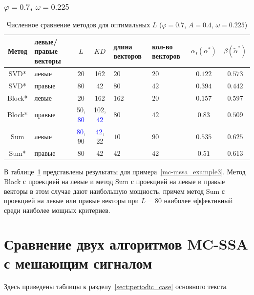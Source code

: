 \documentclass[specialist,
substylefile = spbu.rtx,
               subf,href,colorlinks=true, 12pt]{disser}
\theoremstyle{definition}
\begin{document}
\subsubsection{$\varphi=0.7$, $\omega=0.225$}
\begin{table}[h]
	\caption{Численное сравнение методов для оптимальных $L$ ($\varphi=0.7$, $A=0.4$, $\omega=0.225$)}
	\label{tab:res_mc-mssa_omega0225}
	\centering
	\begin{tabular}{|c>{\centering\arraybackslash}m{1in}cc>{\centering\arraybackslash}m{1in} >{\centering\arraybackslash}m{0.8in}cc|}\hline
		Метод & левые/правые векторы & $L$ & $KD$ & длина векторов & кол-во векторов & $\alpha_I(\alpha^*)$ & $\beta(\widetilde{\alpha}^*)$ \\
		\hline
		SVD* & левые & $20$ & 162 & $20$ & $20$ & $0.122$ & $0.573$ \\
		\hline
		SVD* & правые & $80$ & 42 & $80$ & $42$ & $0.394$ & $0.442$ \\
		\hline
		Block* & левые & $20$ & 162 & $162$ & $20$ & $0.157$ & $\mathbf{0.597}$ \\
		\hline
		Block* & правые & 50, \textcolor{blue}{80} & 102, \textcolor{blue}{42} & $80$ & $42$ & $0.83$ & $0.509$\\
		\hline
		Sum & левые & \textcolor{blue}{80}, 90 & \textcolor{blue}{42}, 22 & $10$ & $90$ & $0.535$ & $\mathbf{0.625}$ \\
		\hline
		Sum* & правые & $80$ & 42 & $42$ & $42$ & $0.51$ & $\mathbf{0.613}$ \\
		\hline
	\end{tabular}
\end{table}
В таблице~\ref{tab:res_mc-mssa_omega0225} представлены результаты для примера~\ref{mc-mssa_example3}. Метод Block с проекцией на левые и метод Sum с проекцией на левые и правые векторы в этом случае дают наибольшую мощность, причем метод Sum с проекцией на левые или правые векторы при $L=80$ наиболее эффективный среди наиболее мощных критериев.

\section{Сравнение двух алгоритмов MC-SSA с мешающим сигналом}\label{appendix:mc-ssa_nuisance_comp_tables}
Здесь приведены таблицы к разделу~\ref{sect:periodic_case} основного текста.
\end{document}

